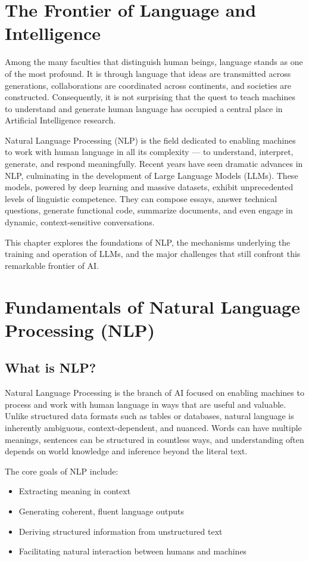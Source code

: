 \documentclass[openany]{book}
\begin{document}
\section{The Frontier of Language and Intelligence}

Among the many faculties that distinguish human beings, language stands as one 
of the most profound. It is through language that ideas are transmitted across 
generations, collaborations are coordinated across continents, and societies 
are constructed. Consequently, it is not surprising that the quest to teach 
machines to understand and generate human language has occupied a central place 
in Artificial Intelligence research.

Natural Language Processing (NLP) is the field dedicated to enabling machines 
to work with human language in all its complexity — to understand, interpret, 
generate, and respond meaningfully. Recent years have seen dramatic advances in 
NLP, culminating in the development of Large Language Models (LLMs). These 
models, powered by deep learning and massive datasets, exhibit unprecedented 
levels of linguistic competence. They can compose essays, answer technical 
questions, generate functional code, summarize documents, and even engage in 
dynamic, context-sensitive conversations.

This chapter explores the foundations of NLP, the mechanisms underlying the 
training and operation of LLMs, and the major challenges that still confront 
this remarkable frontier of AI.

\section{Fundamentals of Natural Language Processing (NLP)}

\subsection{What is NLP?}
Natural Language Processing is the branch of AI focused on enabling machines to 
process and work with human language in ways that are useful and valuable. 
Unlike structured data formats such as tables or databases, natural language is 
inherently ambiguous, context-dependent, and nuanced. Words can have multiple 
meanings, sentences can be structured in countless ways, and understanding often 
depends on world knowledge and inference beyond the literal text.

The core goals of NLP include:
\begin{itemize}
    \item Extracting meaning in context
    \item Generating coherent, fluent language outputs
    \item Deriving structured information from unstructured text
    \item Facilitating natural interaction between humans and machines
\end{itemize}
\end{document}
